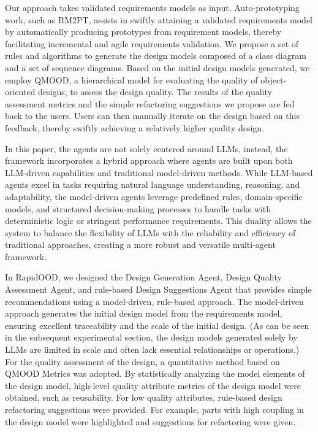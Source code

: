 \documentclass[pdflatex,sn-mathphys-num]{sn-jnl}%
\theoremstyle{thmstyleone}%
\theoremstyle{thmstyletwo}%
\theoremstyle{thmstylethree}%
\begin{document}
Our approach takes validated requirements models as input. Auto-prototyping work, such as RM2PT, assists in swiftly attaining a validated requirements model by automatically producing prototypes from requirement models, thereby facilitating incremental and agile requirements validation. We propose a set of rules and algorithms to generate the design models composed of a class diagram and a set of sequence diagrams. Based on the initial design models generated, we employ QMOOD, a hierarchical model for evaluating the quality of object-oriented designs, to assess the design quality. The results of the quality assessment metrics and the simple refactoring suggestions we propose are fed back to the users. Users can then manually iterate on the design based on this feedback, thereby swiftly achieving a relatively higher quality design.

In this paper, the agents are not solely centered around LLMs, instead, the framework incorporates a hybrid approach where agents are built upon both LLM-driven capabilities and traditional model-driven methods. While LLM-based agents excel in tasks requiring natural language understanding, reasoning, and adaptability, the model-driven agents leverage predefined rules, domain-specific models, and structured decision-making processes to handle tasks with deterministic logic or stringent performance requirements. This duality allows the system to balance the flexibility of LLMs with the reliability and efficiency of traditional approaches, creating a more robust and versatile multi-agent framework.

In RapidOOD, we designed the Design Generation Agent, Design Quality Assessment Agent, and rule-based Design Suggestions Agent that provides simple recommendations using a model-driven, rule-based approach. The model-driven approach generates the initial design model from the requirements model, ensuring excellent traceability and the scale of the initial design. (As can be seen in the subsequent experimental section, the design models generated solely by LLMs are limited in scale and often lack essential relationships or operations.) For the quality assessment of the design, a quantitative method based on QMOOD Metrics was adopted. By statistically analyzing the model elements of the design model, high-level quality attribute metrics of the design model were obtained, such as reusability. For low quality attributes, rule-based design refactoring suggestions were provided. For example, parts with high coupling in the design model were highlighted and suggestions for refactoring were given.
\end{document}
